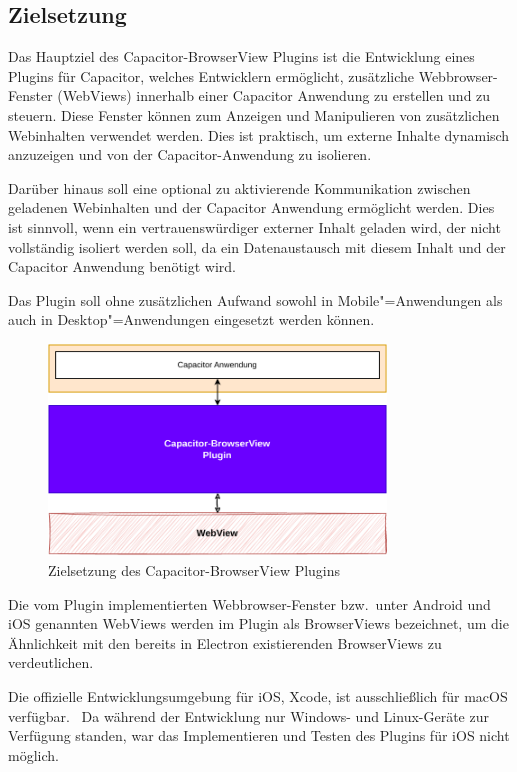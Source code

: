 \subsection{Zielsetzung}

Das Hauptziel des Capacitor-BrowserView Plugins ist die Entwicklung eines Plugins für Capacitor, welches Entwicklern ermöglicht, zusätzliche Webbrowser-Fenster (WebViews) innerhalb einer Capacitor Anwendung zu erstellen und zu steuern.
Diese Fenster können zum Anzeigen und Manipulieren von zusätzlichen Webinhalten verwendet werden.
Dies ist praktisch, um externe Inhalte dynamisch anzuzeigen und von der Capacitor-Anwendung zu isolieren.

Darüber hinaus soll eine optional zu aktivierende Kommunikation zwischen geladenen Webinhalten und der Capacitor Anwendung ermöglicht werden.
Dies ist sinnvoll, wenn ein vertrauenswürdiger externer Inhalt geladen wird, der nicht vollständig isoliert werden soll, da ein Datenaustausch mit diesem Inhalt und der Capacitor Anwendung benötigt wird.

Das Plugin soll ohne zusätzlichen Aufwand sowohl in Mobile"=Anwendungen als auch in Desktop"=Anwendungen eingesetzt werden können.

\begin{figure}[H]
    \centering
    \includegraphics[width=0.8\textwidth]{assets/03_Capacitor-BrowserView/01_Zielsetzung.drawio.pdf}
    \caption[Capacitor-BrowserView / Zielsetzung]{Zielsetzung des Capacitor-BrowserView Plugins}
\end{figure}

Die vom Plugin implementierten Webbrowser-Fenster bzw.\ unter Android und iOS genannten WebViews werden im Plugin als BrowserViews bezeichnet, um die Ähnlichkeit mit den bereits in Electron existierenden BrowserViews zu verdeutlichen.
\cite{android:api, ios:api, electron:docs}

\begin{note}
    Die offizielle Entwicklungsumgebung für iOS, Xcode, ist ausschließlich für macOS verfügbar.~\cite{xcode:support}
    Da während der Entwicklung nur Windows- und Linux-Geräte zur Verfügung standen, war das Implementieren und Testen des Plugins für iOS nicht möglich.
\end{note}

